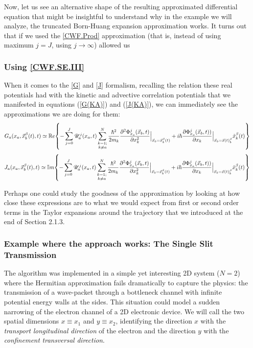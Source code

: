 \documentclass[11pt, a4paper]{article} %
\newcommand{\R}{\mathbb{R}} %
\newcommand{\U}{\mathscr{U}}
\begin{document}
Now, let us see an alternative shape of the resulting approximated differential equation that might be insightful to understand why in the example we will analyze, the truncated Born-Huang expansion approximation works. It turns out that if we used the \ref{CWF.Prod} approximation (that is, instead of using maximum $j=J$, using $j\rightarrow \infty$) allowed us 

\subsubsection{Using \ref{CWF.SE.III}}
When it comes to the \ref{G} and \ref{J} formalism, recalling the relation these real potentials had with the kinetic and advective correlation potentials that we manifested in equations (\ref{G(KA)}) and (\ref{J(KA)}), we can immediately see the approximations we are doing for them:
$$
G_a(x_a,\vec{x}_b^\beta(t),t)\simeq \R e \qty{ - \sum_{j=0}^J  \U^j_a(x_a,t) \sum_{\substack{k=1; \\ k\neq a}}^{N}  \frac{\hbar^2}{2m_k} \pdv[2]{ \Phi_{x_a}^j(\vec{x}_b,t)}{x_k}\Big\rvert_{\vec{x}_b=\vec{x}_b^\beta(t)} +  i \hbar \pdv{ \Phi_{x_a}^j(\vec{x}_b,t))}{x_k}\Big\rvert_{\vec{x}_b=\vec{x}(t)_b^\beta} \dot{x}_k^\beta(t)}
$$
$$
J_a(x_a,\vec{x}_b^\beta(t),t)\simeq \mathbb{I} m \qty{ - \sum_{j=0}^J  \U^j_a(x_a,t) \sum_{\substack{k=1; \\ k\neq a}}^{N}  \frac{\hbar^2}{2m_k} \pdv[2]{ \Phi_{x_a}^j(\vec{x}_b,t)}{x_k}\Big\rvert_{\vec{x}_b=\vec{x}_b^\beta(t)} +  i \hbar \pdv{ \Phi_{x_a}^j(\vec{x}_b,t))}{x_k}\Big\rvert_{\vec{x}_b=\vec{x}(t)_b^\beta} \dot{x}_k^\beta(t)}
$$

Perhaps one could study the goodness of the approximation by looking at how close these expressions are to what we would expect from first or second order terms in the Taylor expansions around the trajectory that we introduced at the end of Section 2.1.3.


\subsubsection{Example where the approach works: The Single Slit Transmission}
The algorithm was implemented in a simple yet interesting 2D system ($N=2$) where the Hermitian approximation fails dramatically to capture the physics: the transmission of a wave-packet through a bottleneck channel with infinite potential energy walls at the sides. This situation could model a sudden narrowing of the electron channel of a 2D electronic device. We will call the two spatial dimensions $x\equiv x_1$ and $y\equiv x_2$, identifying the direction $x$ with the {\em transport longitudinal direction} of the electron and the direction $y$ with the {\em confinement transversal direction}.
\end{document}
